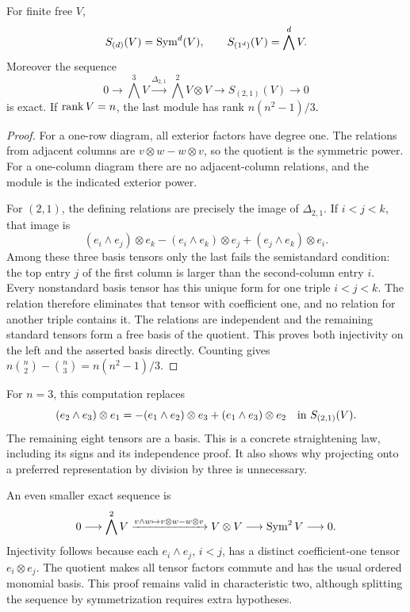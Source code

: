 \begin{proposition}
For finite free \(V\),
\[
 S_{(d)}(V)=\operatorname{Sym}^d(V),\qquad
 S_{(1^d)}(V)=\bigwedge^dV.
\]
Moreover the sequence
\[
 0\longrightarrow\bigwedge^3V
   \xrightarrow{\Delta_{2,1}}\bigwedge^2V\otimes V
   \longrightarrow S_{(2,1)}(V)\longrightarrow0
\]
is exact.  If \(\operatorname{rank} V=n\), the last module has rank
\(n(n^2-1)/3\).
\end{proposition}
\begin{proof}
For a one-row diagram, all exterior factors have degree one.
The relations from adjacent columns are
\(v\otimes w-w\otimes v\), so the quotient is the symmetric power.
For a one-column diagram there are no adjacent-column relations,
and the module is the indicated exterior power.

For \((2,1)\), the defining relations are precisely the image of
\(\Delta_{2,1}\).  If \(i<j<k\), that image is
\[
 (e_i\wedge e_j)\otimes e_k
 -(e_i\wedge e_k)\otimes e_j
 +(e_j\wedge e_k)\otimes e_i.
 \]
Among these three basis tensors only the last fails the
semistandard condition: the top entry \(j\) of the first column
is larger than the second-column entry \(i\).
Every nonstandard basis tensor has this unique form for one
triple \(i<j<k\).  The relation therefore eliminates that tensor
with coefficient one, and no relation for another triple
contains it.  The relations are independent and the remaining
standard tensors form a free basis of the quotient.
This proves both injectivity on the left and the asserted
basis directly.  Counting gives
\(n\binom n2-\binom n3=n(n^2-1)/3\).
\end{proof}

For \(n=3\), this computation replaces
\[
 (e_2\wedge e_3)\otimes e_1
 =-(e_1\wedge e_2)\otimes e_3
   +(e_1\wedge e_3)\otimes e_2
 \quad\hbox{in } S_{(2,1)}(V).
\]
The remaining eight tensors are a basis.  This is a concrete
straightening law, including its signs and its independence proof.
It also shows why projecting onto a preferred representation by
division by three is unnecessary.

An even smaller exact sequence is
\[
 0\longrightarrow\bigwedge^2V
  \xrightarrow{v\wedge w\mapsto v\otimes w-w\otimes v}
  V\otimes V\longrightarrow\operatorname{Sym}^2V\longrightarrow0.
\]
Injectivity follows because each \(e_i\wedge e_j\), \(i<j\),
has a distinct coefficient-one tensor \(e_i\otimes e_j\).
The quotient makes all tensor factors commute and has the
usual ordered monomial basis.  This proof remains valid in
characteristic two, although splitting the sequence by
symmetrization requires extra hypotheses.

